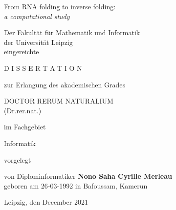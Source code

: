 \thispagestyle{empty}
{\Large
\begin{center}
	From RNA folding to  inverse folding:\\
	\textit{a computational study}
\end{center}}
\vspace*{0.7cm}
\begin{center}
Der Fakult\"at f\"ur Mathematik und Informatik\\
der Universit\"at Leipzig\\
eingereichte
\end{center}
\vspace*{0.7cm}
\begin{center}
D I S S E R T A T I O N
\end{center}
\vspace*{0.7cm}
\begin{center}
zur Erlangung des akademischen Grades
\end{center}

\begin{center}
DOCTOR RERUM NATURALIUM\\
(Dr.rer.nat.)
\end{center}
\vspace*{0.5cm}
\begin{center}
im Fachgebiet 
\end{center}
\begin{center}
Informatik
\end{center}
\begin{center}
vorgelegt 
\end{center}
\vspace*{0.7cm}
\begin{center}
von Diplominformatiker \textbf{Nono Saha Cyrille Merleau}\\
geboren am 26-03-1992 \hspace{0em} in Bafoussam, Kamerun
\end{center}
\vspace{1cm}

\begin{center}
Leipzig, den {December 2021}
\end{center}

